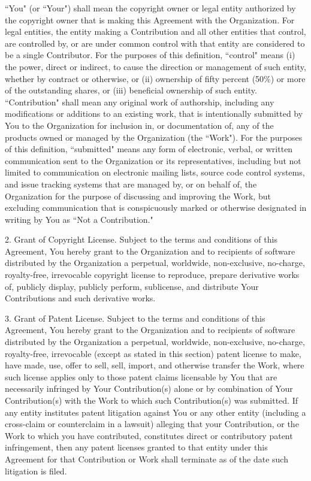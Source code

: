 \documentclass{article}
\begin{document}
“You" (or “Your") shall mean the copyright owner or legal entity
authorized by the copyright owner that is making this Agreement
with the Organization. For legal entities, the entity making a
Contribution and all other entities that control, are controlled
by, or are under common control with that entity are considered to
be a single Contributor. For the purposes of this definition,
“control" means (i) the power, direct or indirect, to cause the
direction or management of such entity, whether by contract or
otherwise, or (ii) ownership of fifty percent (50\%) or more of the
outstanding shares, or (iii) beneficial ownership of such entity.
“Contribution" shall mean any original work of authorship,
including any modifications or additions to an existing work, that
is intentionally submitted by You to the Organization for inclusion
in, or documentation of, any of the products owned or managed by
the Organization (the “Work"). For the purposes of this definition,
“submitted" means any form of electronic, verbal, or written
communication sent to the Organization or its representatives,
including but not limited to communication on electronic mailing
lists, source code control systems, and issue tracking systems that
are managed by, or on behalf of, the Organization for the purpose of
discussing and improving the Work, but excluding communication that
is conspicuously marked or otherwise designated in writing by You
as “Not a Contribution."

2. Grant of Copyright License. Subject to the terms and conditions of
this Agreement, You hereby grant to the Organization and to
recipients of software distributed by the Organization a perpetual,
worldwide, non-exclusive, no-charge, royalty-free, irrevocable
copyright license to reproduce, prepare derivative works of,
publicly display, publicly perform, sublicense, and distribute Your
Contributions and such derivative works.

3. Grant of Patent License. Subject to the terms and conditions of
this Agreement, You hereby grant to the Organization and to
recipients of software distributed by the Organization a perpetual,
worldwide, non-exclusive, no-charge, royalty-free, irrevocable
(except as stated in this section) patent license to make, have
made, use, offer to sell, sell, import, and otherwise transfer the
Work, where such license applies only to those patent claims
licensable by You that are necessarily infringed by Your
Contribution(s) alone or by combination of Your Contribution(s)
with the Work to which such Contribution(s) was submitted. If any
entity institutes patent litigation against You or any other entity
(including a cross-claim or counterclaim in a lawsuit) alleging
that your Contribution, or the Work to which you have contributed,
constitutes direct or contributory patent infringement, then any
patent licenses granted to that entity under this Agreement for
that Contribution or Work shall terminate as of the date such
litigation is filed.
\end{document}

